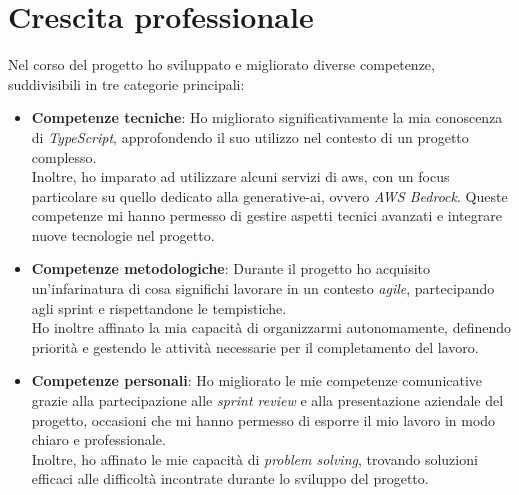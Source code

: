 \section{Crescita professionale}
\label{sez:crescita-professionale}

Nel corso del progetto ho sviluppato e migliorato diverse competenze, suddivisibili in tre categorie principali:

\begin{itemize}
    \item \textbf{Competenze tecniche}:
Ho migliorato significativamente la mia conoscenza di \textit{TypeScript}, approfondendo il suo utilizzo nel contesto di un progetto complesso. \\
Inoltre, ho imparato ad utilizzare alcuni servizi di \gls{aws}, con un focus particolare su quello dedicato alla \gls{generative-ai}, ovvero \textit{AWS Bedrock}. Queste competenze mi hanno permesso di gestire aspetti tecnici avanzati e integrare nuove tecnologie nel progetto.

\item \textbf{Competenze metodologiche}:
Durante il progetto ho acquisito un'infarinatura di cosa significhi lavorare in un contesto \textit{agile}, partecipando agli \gls{sprint} e rispettandone le tempistiche. \\
Ho inoltre affinato la mia capacità di organizzarmi autonomamente, definendo priorità e gestendo le attività necessarie per il completamento del lavoro.

\item \textbf{Competenze personali}:
Ho migliorato le mie competenze comunicative grazie alla partecipazione alle \textit{sprint review} e alla presentazione aziendale del progetto, occasioni che mi hanno permesso di esporre il mio lavoro in modo chiaro e professionale. \\
Inoltre, ho affinato le mie capacità di \textit{problem solving}, trovando soluzioni efficaci alle difficoltà incontrate durante lo sviluppo del progetto.
\end{itemize}
